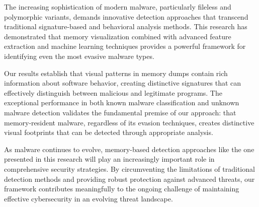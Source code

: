 The increasing sophistication of modern malware, particularly fileless and polymorphic variants, demands innovative detection approaches that transcend traditional signature-based and behavioral analysis methods. This research has demonstrated that memory visualization combined with advanced feature extraction and machine learning techniques provides a powerful framework for identifying even the most evasive malware types.

Our results establish that visual patterns in memory dumps contain rich information about software behavior, creating distinctive signatures that can effectively distinguish between malicious and legitimate programs. The exceptional performance in both known malware classification and unknown malware detection validates the fundamental premise of our approach: that memory-resident malware, regardless of its evasion techniques, creates distinctive visual footprints that can be detected through appropriate analysis.

As malware continues to evolve, memory-based detection approaches like the one presented in this research will play an increasingly important role in comprehensive security strategies. By circumventing the limitations of traditional detection methods and providing robust protection against advanced threats, our framework contributes meaningfully to the ongoing challenge of maintaining effective cybersecurity in an evolving threat landscape.
